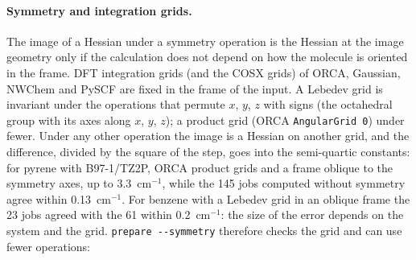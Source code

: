 \paragraph{Symmetry and integration grids.} The image of a Hessian under
a symmetry operation is the Hessian at the image geometry only if the
calculation does not depend on how the molecule is oriented in the
frame. DFT integration grids (and the COSX grids) of ORCA, Gaussian,
NWChem and PySCF are fixed in the frame of the input. A Lebedev grid is
invariant under the operations that permute $x$, $y$, $z$ with signs
(the octahedral group with its axes along $x$, $y$, $z$); a product
grid (ORCA \texttt{AngularGrid 0}) under fewer. Under any other
operation the image is a Hessian on another grid, and the difference,
divided by the square of the step, goes into the semi-quartic constants:
for pyrene with B97-1/TZ2P, ORCA product grids and a frame oblique to
the symmetry axes, up to 3.3~cm$^{-1}$, while the 145 jobs computed
without symmetry agree within 0.13~cm$^{-1}$. For benzene with a Lebedev grid in an
oblique frame the 23 jobs agreed with the 61 within 0.2~cm$^{-1}$: the
size of the error depends on the system and the grid. \texttt{prepare
-{}-symmetry} therefore checks the grid and can use fewer operations:

